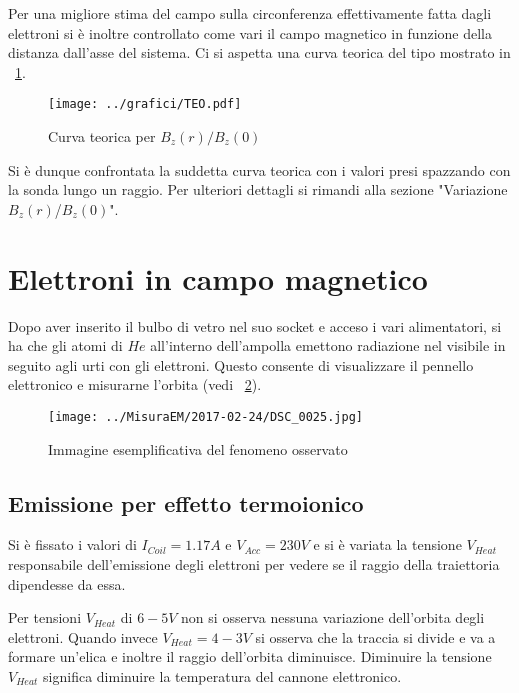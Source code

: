\documentclass[10pt,a4paper]{article}
\begin{document}
Per una migliore stima del campo sulla circonferenza effettivamente fatta dagli elettroni si è inoltre controllato come vari il campo magnetico in funzione della distanza dall'asse del sistema. Ci si aspetta una curva teorica del tipo mostrato in \figurename{~\ref{fig:TEO}}.


\begin{figure}[H]
	\centering
	\texttt{[image: ../grafici/TEO.pdf]}
	\caption{Curva teorica per $B_z(r)/B_z(0)$}
	\label{fig:TEO}
\end{figure}


Si è dunque confrontata la suddetta curva teorica con i valori presi spazzando con la sonda lungo un raggio. Per ulteriori dettagli si rimandi alla sezione "Variazione $B_z(r)$/$B_z(0)$".



\section{Elettroni in campo magnetico}
Dopo aver inserito il bulbo di vetro nel suo socket e acceso i vari alimentatori, si ha che gli atomi di $He$ all'interno dell'ampolla emettono radiazione nel visibile in seguito agli urti con gli elettroni. Questo consente di visualizzare il pennello elettronico e misurarne l'orbita (vedi \figurename{~\ref{fig:ex1}}).

\begin{figure}[H]
	\centering
	\texttt{[image: ../MisuraEM/2017-02-24/DSC\_0025.jpg]}
	\caption{Immagine esemplificativa del fenomeno osservato}
	\label{fig:ex1}
\end{figure}

\subsection{Emissione per effetto termoionico}

Si è fissato i valori di $I_{Coil} = \unit{1.17}{A}$ e $V_{Acc} = \unit{230}{V}$ e si è variata la tensione $V_{Heat}$ responsabile dell'emissione degli elettroni per vedere se il raggio della traiettoria dipendesse da essa.

Per tensioni $V_{Heat}$ di $\unit{6-5}{V}$ non si osserva nessuna variazione dell'orbita degli elettroni. Quando invece $V_{Heat} = \unit{4-3}{V}$ si osserva che la traccia si divide e va a formare un'elica e inoltre il raggio dell'orbita diminuisce. Diminuire la tensione $V_{Heat}$ significa diminuire la temperatura del cannone elettronico.
\end{document}
